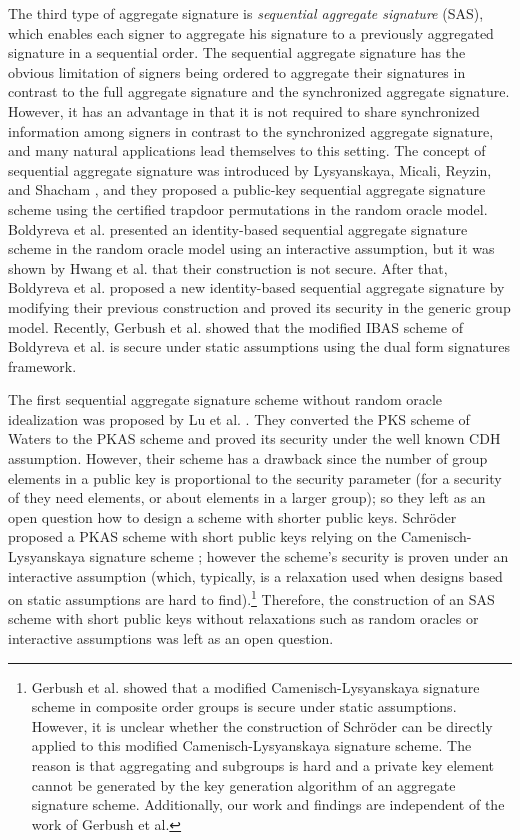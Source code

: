 \documentclass[11pt,letterpaper]{article}
\begin{document}
The third type of aggregate signature is \textit{sequential aggregate
signature} (SAS), which enables each signer to aggregate his signature to a
previously aggregated signature in a sequential order. The sequential
aggregate signature has the obvious limitation of signers being ordered to
aggregate their signatures in contrast to the full aggregate signature and
the synchronized aggregate signature. However, it has an advantage in that it
is not required to share synchronized information among signers in contrast
to the synchronized aggregate signature, and many natural applications lead
themselves to this setting. The concept of sequential aggregate signature was
introduced by Lysyanskaya, Micali, Reyzin, and Shacham
\cite{LysyanskayaMRS04}, and they proposed a public-key sequential aggregate
signature scheme using the certified trapdoor permutations in the random
oracle model. Boldyreva et al. \cite{BoldyrevaGOY07} presented an
identity-based sequential aggregate signature scheme in the random oracle
model using an interactive assumption, but it was shown by Hwang et al.
\cite{HwangLY09} that their construction is not secure. After that, Boldyreva
et al. \cite{BoldyrevaGOY10} proposed a new identity-based sequential
aggregate signature by modifying their previous construction and proved its
security in the generic group model. Recently, Gerbush et al.
\cite{GerbushLOW12} showed that the modified IBAS scheme of Boldyreva et al.
\cite{BoldyrevaGOY10} is secure under static assumptions using the dual form
signatures framework.

The first sequential aggregate signature scheme without random oracle
idealization was proposed by Lu et al. \cite{LuOSSW06,LuOSSW13}. They
converted the PKS scheme of Waters \cite{Waters05} to the PKAS scheme and
proved its security under the well known CDH assumption. However, their
scheme has a drawback since the number of group elements in a public key is
proportional to the security parameter (for a security of  they need
 elements, or about  elements in a larger group); so they left as an
open question how to design a scheme with shorter public keys. Schr{\"o}der
proposed a PKAS scheme with short public keys relying on the
Camenisch-Lysyanskaya signature scheme \cite{Schroder11}; however the
scheme's security is proven under an interactive assumption (which,
typically, is a relaxation used when designs based on static assumptions are
hard to find).\footnote{Gerbush et al. \cite{GerbushLOW12} showed that a
modified Camenisch-Lysyanskaya signature scheme in composite order groups is
secure under static assumptions. However, it is unclear whether the
construction of Schr{\"o}der can be directly applied to this modified
Camenisch-Lysyanskaya signature scheme. The reason is that aggregating
 and  subgroups is hard and a private key element
 cannot be generated by the key generation
algorithm of an aggregate signature scheme. Additionally, our work and
findings are independent of the work of Gerbush et al.} Therefore, the
construction of an SAS scheme with short public keys without relaxations such
as random oracles or interactive assumptions was left as an open question.
\end{document}
